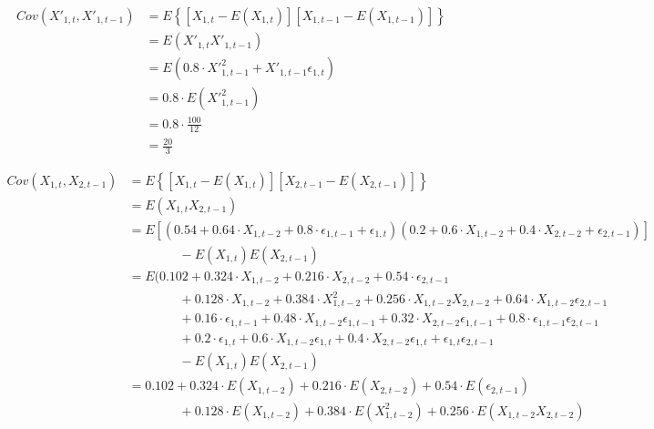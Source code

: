 \begin{solution}
\begin{equation}
\begin{aligned}
Cov(X'_{1,t},X'_{1,t-1})  & = E\left\{[X_{1,t} - E(X_{1,t})][X_{1,t-1} - E(X_{1,t-1})]\right\} \\
													& = E(X'_{1,t}X'_{1,t-1})\\
													& = E\left(0.8 \cdot {X'}_{1,t-1}^2 +  X'_{1,t-1}\epsilon_{1,t} \right)\\
													& = 0.8 \cdot E({X'}_{1,t-1}^2) \\
													& = 0.8 \cdot \frac{100}{12} \\
													& = \frac{20}{3}
\end{aligned}
\end{equation}

\begin{equation}
\begin{aligned}
Cov(X_{1,t},X_{2,t-1}) 	& = E\left\{[X_{1,t} - E(X_{1,t})][X_{2,t-1} - E(X_{2,t-1})]\right\} \\
													& = E(X_{1,t}X_{2,t-1})\\
													& = E[(0.54 + 0.64 \cdot X_{1,t-2} + 0.8 \cdot \epsilon_{1,t-1} + \epsilon_{1,t})
																 (0.2 + 0.6 \cdot X_{1,t-2} + 0.4 \cdot X_{2,t-2} + \epsilon_{2,t-1})] \\
						& \qquad \qquad - E(X_{1,t})E(X_{2,t-1}) \\
													& = E(0.102 + 0.324 \cdot X_{1,t-2} + 0.216 \cdot X_{2,t-2} + 0.54 \cdot \epsilon_{2,t-1} \\
						& \qquad \qquad + 0.128 \cdot X_{1,t-2} + 0.384 \cdot X_{1,t-2}^2 + 0.256 \cdot X_{1,t-2}X_{2,t-2} + 0.64 \cdot X_{1,t-2}\epsilon_{2,t-1} \\
						& \qquad \qquad + 0.16 \cdot \epsilon_{1,t-1} + 0.48 \cdot X_{1,t-2}\epsilon_{1,t-1} + 0.32 \cdot X_{2,t-2}\epsilon_{1,t-1} + 0.8 \cdot \epsilon_{1,t-1}\epsilon_{2,t-1} \\
						& \qquad \qquad + 0.2 \cdot \epsilon_{1,t} + 0.6 \cdot X_{1,t-2}\epsilon_{1,t} + 0.4 \cdot X_{2,t-2}\epsilon_{1,t} + \epsilon_{1,t}\epsilon_{2,t-1} \\
						& \qquad \qquad - E(X_{1,t})E(X_{2,t-1}) \\
													& = 0.102 + 0.324 \cdot E(X_{1,t-2}) + 0.216 \cdot E(X_{2,t-2}) + 0.54 \cdot E(\epsilon_{2,t-1}) \\
						& \qquad \qquad + 0.128 \cdot E(X_{1,t-2}) + 0.384 \cdot E(X_{1,t-2}^2) + 0.256 \cdot E(X_{1,t-2}X_{2,t-2}) \\

\end{aligned}
\end{equation}
\end{solution}
